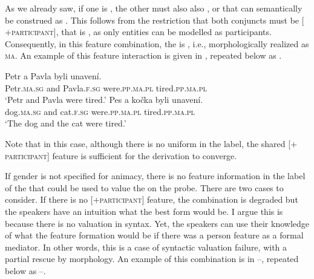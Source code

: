 \documentclass[output=paper,modfontsnewtxmath,hidelinks]{langscibook}
\begin{document}
As we already saw, if one  is  , the other  must also also  , or   that can semantically be construed as . This follows from the restriction that both conjuncts must be [$+$\textsc{participant}], that is , as only  entities can be modelled as participants. Consequently, in this feature combination, the  is , i.e., morphologically realized as \textsc{ma}. An example of this feature interaction is given in , repeated below as .


\ea\label{anim-2-rep}
\ea\gll Petr a Pavla byli unavení.\\
Petr.\textsc{ma.sg} and Pavla.\textsc{f.sg} were.\textsc{pp.ma.pl} tired.\textsc{pp.ma.pl}\\
\glt `Petr and Pavla were tired.'\smallskip
\ex\gll  Pes a kočka byli unavení.\\
dog.\textsc{ma.sg} and cat.\textsc{f.sg} were.\textsc{pp.ma.pl} tired.\textsc{pp.ma.pl}\\
\glt `The dog and the cat were tired.'\\
\z
\hfill {}
\z


\noindent Note that in this case, although there is no uniform  in the label, the shared [$+$\textsc{participant}] feature is sufficient for the derivation to converge.

If gender is not specified for animacy, there is no feature information in the label of the  that could be used to value the  on the probe. There are two cases to consider. If there is no [$+$\textsc{participant}] feature, the combination is degraded but the speakers have an intuition what the best form would be. I argue this is because there is no valuation in syntax. Yet, the speakers can use their knowledge of what the feature formation would be if there was a person feature as a formal mediator. In other words, this is a case of syntactic valuation failure, with a partial rescue by morphology. An example of this combination is in --, repeated below as --.


\z
\end{document}
